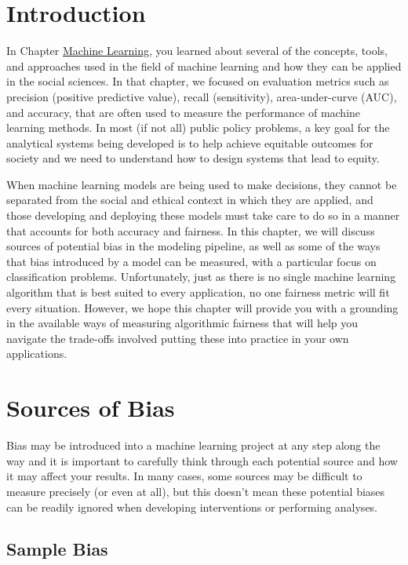 \documentclass[]{krantz}
\begin{document}
\section{Introduction}\label{introduction-4}

In Chapter \protect\hyperlink{chap:ml}{Machine Learning}, you learned
about several of the concepts, tools, and approaches used in the field
of machine learning and how they can be applied in the social sciences.
In that chapter, we focused on evaluation metrics such as precision
(positive predictive value), recall (sensitivity), area-under-curve
(AUC), and accuracy, that are often used to measure the performance of
machine learning methods. In most (if not all) public policy problems, a
key goal for the analytical systems being developed is to help achieve
equitable outcomes for society and we need to understand how to design
systems that lead to equity.

When machine learning models are being used to make decisions, they
cannot be separated from the social and ethical context in which they
are applied, and those developing and deploying these models must take
care to do so in a manner that accounts for both accuracy and fairness.
In this chapter, we will discuss sources of potential bias in the
modeling pipeline, as well as some of the ways that bias introduced by a
model can be measured, with a particular focus on classification
problems. Unfortunately, just as there is no single machine learning
algorithm that is best suited to every application, no one fairness
metric will fit every situation. However, we hope this chapter will
provide you with a grounding in the available ways of measuring
algorithmic fairness that will help you navigate the trade-offs involved
putting these into practice in your own applications.

\hypertarget{sec:biassources}{\section{Sources of
Bias}\label{sec:biassources}}

Bias may be introduced into a machine learning project at any step along
the way and it is important to carefully think through each potential
source and how it may affect your results. In many cases, some sources
may be difficult to measure precisely (or even at all), but this doesn't
mean these potential biases can be readily ignored when developing
interventions or performing analyses.

\subsection{Sample Bias}\label{sample-bias}
\end{document}
